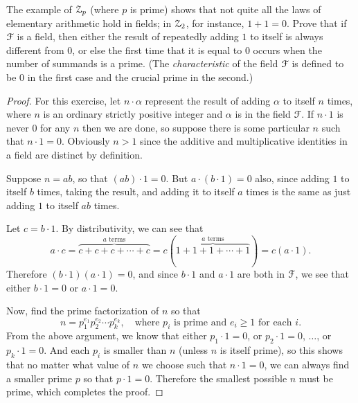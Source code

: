  The example of $\mathcal{Z}_p$ (where $p$ is prime) shows that not
quite all the laws of elementary arithmetic hold in fields; in $\mathcal{Z}_2$,
for instance, $1 + 1 = 0$. Prove that if $\mathcal{F}$ is a field, then either
the result of repeatedly adding $1$ to itself is always different from
$0$, or else the first time that it is equal to $0$ occurs when the
number of summands is a prime. (The {\em characteristic} of the field
$\mathcal{F}$ is defined to be $0$ in the first case and the crucial prime in
the second.)
\begin{proof}
  For this exercise, let $n\cdot\alpha$ represent the result of adding
  $\alpha$ to itself $n$ times, where $n$ is an ordinary strictly
  positive integer and $\alpha$ is in the field $\mathcal{F}$. If $n\cdot1$ is
  never $0$ for any $n$ then we are done, so suppose there is some
  particular $n$ such that $n\cdot1 = 0$. Obviously $n>1$ since the
  additive and multiplicative identities in a field are distinct by
  definition.

  Suppose $n = ab$, so that $(ab)\cdot1 = 0$. But
  $a\cdot(b\cdot1) = 0$ also, since adding $1$ to itself $b$ times,
  taking the result, and adding it to itself $a$ times is the same as
  just adding $1$ to itself $ab$ times.

  Let $c = b\cdot1$. By distributivity, we can see that
  \begin{equation*}
    a\cdot c
    = \overbrace{c + c + c + \cdots + c}^{\text{$a$ terms}}
    = c(\overbrace{1 + 1 + 1 + \cdots + 1}^{\text{$a$ terms}})
    = c(a\cdot 1).
  \end{equation*}
  Therefore $(b\cdot1)(a\cdot1) = 0$, and since $b\cdot1$ and
  $a\cdot1$ are both in $\mathcal{F}$, we see that either $b\cdot1 = 0$ or
  $a\cdot1 = 0$.

  Now, find the prime factorization of $n$ so that
  \begin{equation*}
    n = p_1^{e_1}p_2^{e_2}\cdots p_k^{e_k},
    \quad\text{where $p_i$ is prime and $e_i\geq1$ for each $i$}.
  \end{equation*}
  From the above argument, we know that either $p_1\cdot1 = 0$, or
  $p_2\cdot1 = 0$, $\dots$, or $p_k\cdot1 = 0$. And each $p_i$ is
  smaller than $n$ (unless $n$ is itself prime), so this shows that no
  matter what value of $n$ we choose such that $n\cdot1 = 0$, we can
  always find a smaller prime $p$ so that $p\cdot1 = 0$. Therefore the
  smallest possible $n$ must be prime, which completes the proof.
\end{proof}

